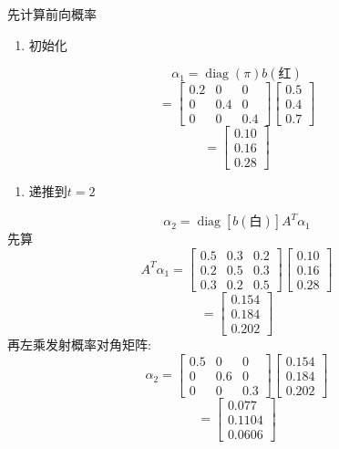 先计算前向概率

\begin{enumerate}
\item[1.] 初始化
\end{enumerate}
\[
\alpha_1 = \operatorname{diag}(\pi) b(\text{红})
\]
\[
=
  \begin{bmatrix}0.2 & 0 & 0 \\ 0 & 0.4 & 0 \\ 0 & 0 & 0.4\end{bmatrix}
  \begin{bmatrix}0.5 \\ 0.4 \\ 0.7\end{bmatrix}
\]
\[
= \begin{bmatrix}0.10 \\ 0.16 \\ 0.28\end{bmatrix}
\]

\begin{enumerate}
\item[2.] 递推到$t=2$
\end{enumerate}
\[
\alpha_2 = \operatorname{diag}[b(\text{白})] A^T \alpha_1
\]
先算
\[
A^T \alpha_1
    =
    \begin{bmatrix}0.5 & 0.3 & 0.2 \\ 0.2 & 0.5 & 0.3 \\ 0.3 & 0.2 & 0.5\end{bmatrix}
    \begin{bmatrix}0.10 \\ 0.16 \\ 0.28\end{bmatrix}
\]
\[
= \begin{bmatrix}0.154 \\ 0.184 \\ 0.202\end{bmatrix}
\]
再左乘发射概率对角矩阵:
\[
\alpha_2
    =
    \begin{bmatrix}0.5 & 0 & 0 \\ 0 & 0.6 & 0 \\ 0 & 0 & 0.3\end{bmatrix}
    \begin{bmatrix}0.154 \\ 0.184 \\ 0.202\end{bmatrix}
\]
\[
= \begin{bmatrix}0.077 \\ 0.1104 \\ 0.0606\end{bmatrix}
\]

